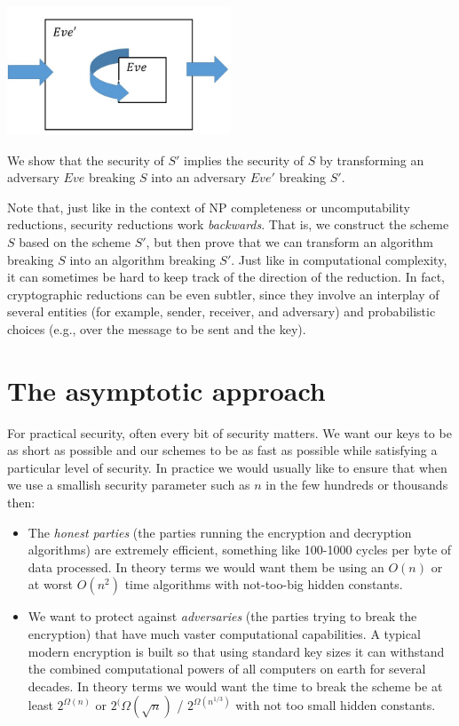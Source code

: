 \begin{marginfigure}
\centering
\includegraphics[width=\linewidth, height=1.5in, keepaspectratio]{../figure/reduction.jpg}
\caption{We show that the security of \(S'\) implies the security of
\(S\) by transforming an adversary \(Eve\) breaking \(S\) into an
adversary \(Eve'\) breaking \(S'\).}
\label{reductiongenfig}
\end{marginfigure}

Note that, just like in the context of NP completeness or
uncomputability reductions, security reductions work \emph{backwards}.
That is, we construct the scheme \(S\) based on the scheme \(S'\), but
then prove that we can transform an algorithm breaking \(S\) into an
algorithm breaking \(S'\). Just like in computational complexity, it can
sometimes be hard to keep track of the direction of the reduction. In
fact, cryptographic reductions can be even subtler, since they involve
an interplay of several entities (for example, sender, receiver, and
adversary) and probabilistic choices (e.g., over the message to be sent
and the key).

\section{The asymptotic approach}\label{The-asymptotic-approach}

For practical security, often every bit of security matters. We want our
keys to be as short as possible and our schemes to be as fast as
possible while satisfying a particular level of security. In practice we
would usually like to ensure that when we use a smallish security
parameter such as \(n\) in the few hundreds or thousands then:

\begin{itemize}
\item
  The \emph{honest parties} (the parties running the encryption and
  decryption algorithms) are extremely efficient, something like
  100-1000 cycles per byte of data processed. In theory terms we would
  want them be using an \(O(n)\) or at worst \(O(n^2)\) time algorithms
  with not-too-big hidden constants.
\item
  We want to protect against \emph{adversaries} (the parties trying to
  break the encryption) that have much vaster computational
  capabilities. A typical modern encryption is built so that using
  standard key sizes it can withstand the combined computational powers
  of all computers on earth for several decades. In theory terms we
  would want the time to break the scheme be at least \(2^{\Omega(n)}\)
  or \(2^(\Omega(\sqrt{n})\) / \(2^{\Omega(n^{1/3})}\) with not too
  small hidden constants.
\end{itemize}

